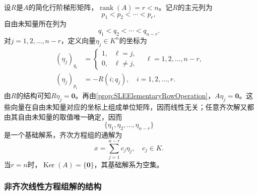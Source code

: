 \begin{method}
	设$R$是$A$的简化行阶梯形矩阵，$\operatorname{rank}(A)=r<n$。记$R$的主元列为
	\begin{equation*}
		p_1<p_2<\cdots<p_r,
	\end{equation*}
	自由未知量所在列为
	\begin{equation*}
		q_1<q_2<\cdots<q_{n-r}.
	\end{equation*}
	对$j=1,2,\dots,n-r$，定义向量$\eta_j\in K^n$的坐标为
	\begin{align*}
		(\eta_j)_{q_\ell}
		&=
		\begin{cases}
			1,&\ell=j,\\
			0,&\ell\ne j,
		\end{cases}
		\quad \ell=1,2,\dots,n-r,\\
		(\eta_j)_{p_i}
		&=-R(i;q_j),
		\quad i=1,2,\dots,r.
	\end{align*}
	由$R$的结构可知$R\eta_j=\mathbf{0}$。再由\cref{prop:SLEElementaryRowOperation}，$A\eta_j=\mathbf{0}$。这些向量在自由未知量对应的坐标上组成单位矩阵，因而线性无关；任意齐次解又都由其自由未知量的取值唯一确定，因而
	\begin{equation*}
		\{\eta_1,\eta_2,\dots,\eta_{n-r}\}
	\end{equation*}
	是一个基础解系，齐次方程组的通解为
	\begin{equation*}
		x=\sum_{j=1}^{n-r}c_j\eta_j,\quad c_j\in K.
	\end{equation*}
	当$r=n$时，$\operatorname{Ker}(A)=\{\mathbf{0}\}$，其基础解系为空集。
\end{method}

\subsubsection{非齐次线性方程组解的结构}

